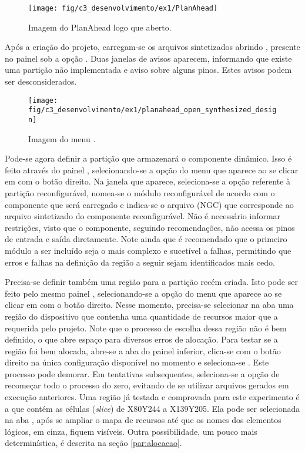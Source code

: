 \documentclass[11pt,a4paper,oneside]{book}
\begin{document}
\begin{figure}[h]
\centering
\texttt{[image: fig/c3\_desenvolvimento/ex1/PlanAhead]}
\caption{Imagem do PlanAhead logo que aberto.}
\label{fig:ex1:planahead}
\end{figure}

Após a criação do projeto, carregam-se os arquivos sintetizados abrindo , presente no painel  sob a opção .
Duas janelas de avisos aparecem, informando que existe uma partição não implementada e aviso sobre alguns pinos.
Estes avisos podem ser desconsiderados.

\begin{figure}[h]
\centering
\texttt{[image: fig/c3\_desenvolvimento/ex1/planahead\_open\_synthesized\_design]}
\caption{Imagem do menu .}
\label{fig:ex1:planahead_open_synthesized_design}
\end{figure}

Pode-se agora definir a partição que armazenará o componente dinâmico.
Isso é feito através do painel , selecionando-se a opção  do menu que aparece ao se clicar em  com o botão direito.
Na janela que aparece, seleciona-se a opção referente à partição reconfigurável, nomea-se o módulo reconfigurável de acordo com o componente que será carregado e indica-se o arquivo (NGC) que corresponde ao arquivo sintetizado do componente reconfigurável.
Não é necessário informar restrições, visto que o componente, seguindo recomendações, não acessa os pinos de entrada e saída diretamente.
Note ainda que é recomendado que o primeiro módulo a ser incluído seja o mais complexo e sucetível a falhas, permitindo que erros e falhas na definição da região a seguir sejam identificados mais cedo.

Precisa-se definir também uma região para a partição recém criada.
Isto pode ser feito pelo mesmo painel , selecionando-se a opção  do menu que aparece ao se clicar em  com o botão direito.
Nesse momento, precisa-se selecionar na aba  uma região do dispositivo que contenha uma quantidade de recursos maior que a requerida pelo projeto.
Note que o processo de escolha dessa região não é bem definido, o que abre espaço para diversos erros de alocação.
Para testar se a região foi bem alocada, abre-se a aba  do painel inferior, clica-se com o botão direito na única configuração disponível no momento e seleciona-se .
Este processo pode demorar.
Em tentativas subsequentes, seleciona-se a opção de recomeçar todo o processo do zero, evitando de se utilizar arquivos gerados em execução anteriores.
Uma região já testada e comprovada para este experimento é a que contém as células (\textit{slice}) de X80Y244 a X139Y205.
Ela pode ser selecionada na aba , após se ampliar o mapa de recursos até que os nomes dos elementos lógicos, em cinza, fiquem visíveis.
Outra possibilidade, um pouco mais determinística, é descrita na seção \ref{par:alocacao}.
\end{document}

